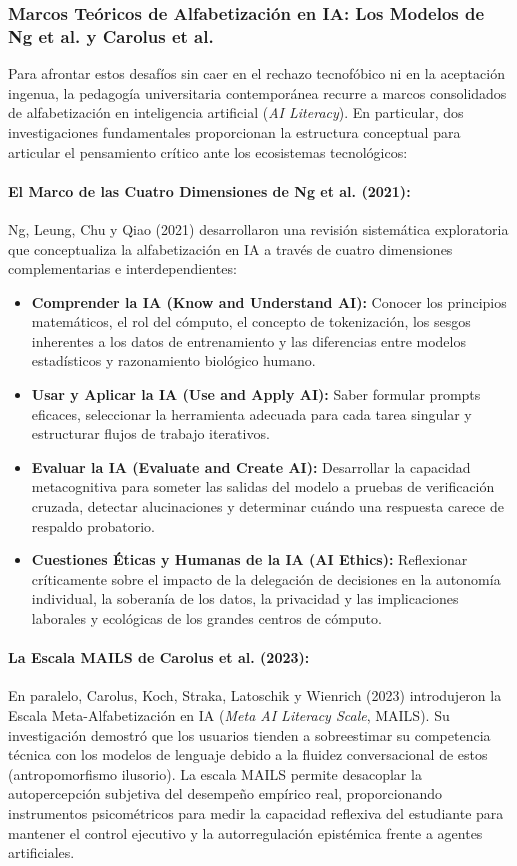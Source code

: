 \subsubsection{Marcos Teóricos de Alfabetización en IA: Los Modelos de Ng et al. y Carolus et al.}

Para afrontar estos desafíos sin caer en el rechazo tecnofóbico ni en la aceptación ingenua, la pedagogía universitaria contemporánea recurre a marcos consolidados de alfabetización en inteligencia artificial (\textit{AI Literacy}). En particular, dos investigaciones fundamentales proporcionan la estructura conceptual para articular el pensamiento crítico ante los ecosistemas tecnológicos:

\paragraph{El Marco de las Cuatro Dimensiones de Ng et al. (2021):}
Ng, Leung, Chu y Qiao (2021) desarrollaron una revisión sistemática exploratoria que conceptualiza la alfabetización en IA a través de cuatro dimensiones complementarias e interdependientes:
\begin{itemize}
    \item \textbf{Comprender la IA (Know and Understand AI):} Conocer los principios matemáticos, el rol del cómputo, el concepto de tokenización, los sesgos inherentes a los datos de entrenamiento y las diferencias entre modelos estadísticos y razonamiento biológico humano.
    \item \textbf{Usar y Aplicar la IA (Use and Apply AI):} Saber formular prompts eficaces, seleccionar la herramienta adecuada para cada tarea singular y estructurar flujos de trabajo iterativos.
    \item \textbf{Evaluar la IA (Evaluate and Create AI):} Desarrollar la capacidad metacognitiva para someter las salidas del modelo a pruebas de verificación cruzada, detectar alucinaciones y determinar cuándo una respuesta carece de respaldo probatorio.
    \item \textbf{Cuestiones Éticas y Humanas de la IA (AI Ethics):} Reflexionar críticamente sobre el impacto de la delegación de decisiones en la autonomía individual, la soberanía de los datos, la privacidad y las implicaciones laborales y ecológicas de los grandes centros de cómputo.
\end{itemize}

\paragraph{La Escala MAILS de Carolus et al. (2023):}
En paralelo, Carolus, Koch, Straka, Latoschik y Wienrich (2023) introdujeron la Escala Meta-Alfabetización en IA (\textit{Meta AI Literacy Scale}, MAILS). Su investigación demostró que los usuarios tienden a sobreestimar su competencia técnica con los modelos de lenguaje debido a la fluidez conversacional de estos (antropomorfismo ilusorio). La escala MAILS permite desacoplar la autopercepción subjetiva del desempeño empírico real, proporcionando instrumentos psicométricos para medir la capacidad reflexiva del estudiante para mantener el control ejecutivo y la autorregulación epistémica frente a agentes artificiales.

